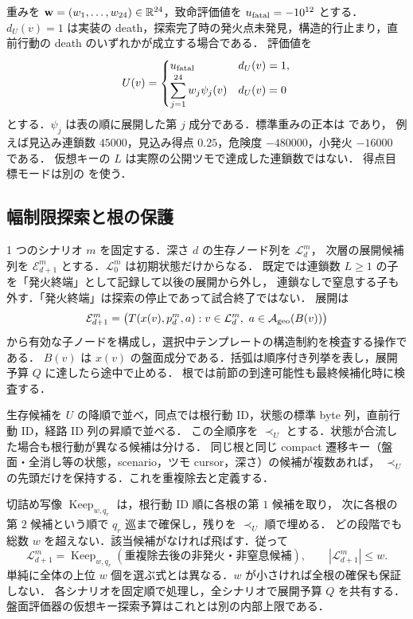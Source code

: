 

重みを $\mathbf w=(w_1,\ldots,w_{24})\in\mathbb{R}^{24}$，致命評価値を $u_{\rm fatal}=-10^{12}$ とする．
$d_U(v)=1$ は実装の death，探索完了時の発火点未発見，構造的行止まり，直前行動の death のいずれかが成立する場合である．
評価値を
\begin{equation}\label{eq:evaluator}
 U(v)=\begin{cases}u_{\rm fatal}&d_U(v)=1,\\
 \displaystyle\sum_{j=1}^{24}w_j\psi_j(v)&d_U(v)=0
 \end{cases}
\end{equation}
とする．$\psi_j$ は表の順に展開した第 $j$ 成分である．標準重みの正本は
 であり，
例えば見込み連鎖数 $45000$，見込み得点 $0.25$，危険度 $-480000$，小発火 $-16000$ である．
仮想キーの $L$ は実際の公開ツモで達成した連鎖数ではない．
得点目標モードは別の  を使う．

\subsection{幅制限探索と根の保護}\label{sec:beam}
1 つのシナリオ $m$ を固定する．深さ $d$ の生存ノード列を $\mathcal L_d^m$，
次層の展開候補列を $\mathcal E_{d+1}^m$ とする．$\mathcal L_0^m$ は初期状態だけからなる．
既定では連鎖数 $L\ge1$ の子を「発火終端」として記録して以後の展開から外し，
連鎖なしで窒息する子も外す．「発火終端」は探索の停止であって試合終了ではない．
展開は
\begin{equation}\label{eq:beam-expand}
 \mathcal E_{d+1}^m=\bigl(T(x(v),p_d^m,a):
       v\in\mathcal L_d^m,\ a\in\mathcal A_{\rm geo}(B(v))\bigr)
\end{equation}
から有効な子ノードを構成し，選択中テンプレートの構造制約を検査する操作である．
$B(v)$ は $x(v)$ の盤面成分である．括弧は順序付き列挙を表し，展開予算 $Q$ に達したら途中で止める．
根では前節の到達可能性も最終候補化時に検査する．

生存候補を $U$ の降順で並べ，同点では根行動 ID，状態の標準 byte 列，直前行動 ID，経路 ID 列の昇順で並べる．
この全順序を $\prec_U$ とする．状態が合流した場合も根行動が異なる候補は分ける．
同じ根と同じ compact 遷移キー（盤面・全消し等の状態，scenario，ツモ cursor，深さ）の候補が複数あれば，
$\prec_U$ の先頭だけを保持する．これを重複除去と定義する．

切詰め写像 $\operatorname{Keep}_{w,q_r}$ は，根行動 ID 順に各根の第 $1$ 候補を取り，
次に各根の第 $2$ 候補という順で $q_r$ 巡まで確保し，残りを $\prec_U$ 順で埋める．
どの段階でも総数 $w$ を超えない．該当候補がなければ飛ばす．従って
\begin{equation}\label{eq:beam-prune}
 \mathcal L_{d+1}^m=\operatorname{Keep}_{w,q_r}
     (\text{重複除去後の非発火・非窒息候補}),\qquad |\mathcal L_{d+1}^m|\le w.
\end{equation}
単純に全体の上位 $w$ 個を選ぶ式とは異なる．$w$ が小さければ全根の確保も保証しない．
各シナリオを固定順で処理し，全シナリオで展開予算 $Q$ を共有する．
盤面評価器の仮想キー探索予算はこれとは別の内部上限である．

